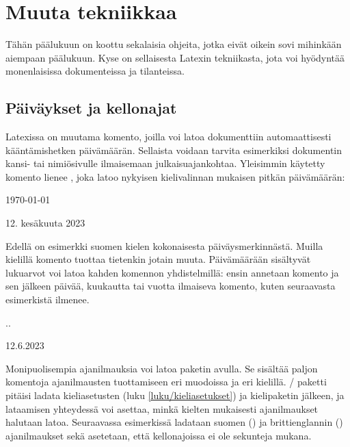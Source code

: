 
\chapter{Muuta tekniikkaa}

Tähän päälukuun on koottu sekalaisia ohjeita, jotka eivät oikein sovi
mihinkään aiempaan päälukuun. Kyse on sellaisesta Latexin tekniikasta,
jota voi hyödyntää monenlaisissa dokumenteissa ja tilanteissa.

\section{Päiväykset ja kellonajat}

Latexissa on muutama komento, joilla voi latoa dokumenttiin
automaattisesti kääntämishetken päivämäärän. Sellaista voidaan tarvita
esimerkiksi dokumentin kansi- tai nimiösivulle ilmaisemaan
julkaisuajankohtaa. Yleisimmin käytetty komento lienee ,
joka latoo nykyisen kielivalinnan mukaisen pitkän päivämäärän:

\begin{koodilohkosis}
\today
\end{koodilohkosis}

\begin{tulossis}
  12. kesäkuuta 2023
\end{tulossis}

\noindent
Edellä on esimerkki suomen kielen kokonaisesta päiväysmerkinnästä.
Muilla kielillä komento tuottaa tietenkin jotain muuta. Päivämäärään
sisältyvät lukuarvot voi latoa kahden komennon yhdistelmillä: ensin
annetaan komento  ja sen jälkeen päivää, kuukautta tai
vuotta ilmaiseva komento, kuten seuraavasta esimerkistä ilmenee.

\begin{koodilohkosis}
\the\day.\the\month.\the\year
\end{koodilohkosis}

\begin{tulossis}
  12.6.2023
\end{tulossis}

\noindent
Monipuolisempia ajanilmauksia voi latoa paketin 
avulla. Se sisältää paljon komentoja ajanilmausten tuottamiseen eri
muodoissa ja eri kielillä. \-/ paketti pitäisi ladata
kieliasetusten (luku \ref{luku/kieliasetukset}) ja kielipaketin jälkeen,
ja lataamisen yhteydessä voi asettaa, minkä kielten mukaisesti
ajanilmaukset halutaan latoa. Seuraavassa esimerkissä ladataan suomen
() ja brittienglannin () ajanilmaukset sekä
asetetaan, että kellonajoissa ei ole sekunteja mukana.

